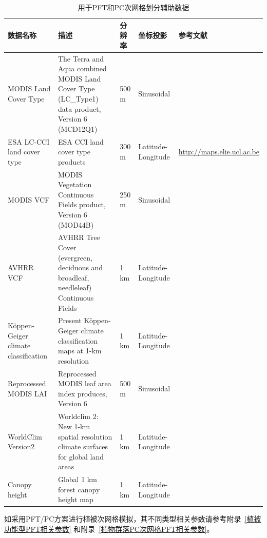 \begin{landscape}
\begin{table}[htbp]
\centering
\caption{用于PFT和PC次网格划分辅助数据}
\label{tab:网格划分辅助数据}

\begin{tabular}[h]{p{3cm}p{6cm}p{2cm}p{2cm}p{5cm}}
\toprule
数据名称      & 描述        & 分辨率   & 坐标投影     & 参考文献           \\ \midrule
MODIS Land Cover Type & The Terra and Aqua combined MODIS Land Cover Type (LC\_Type1) data product, Version 6 (MCD12Q1) & 500 m & Sinusoidal        & \citet{Friedl2019}                \\\midrule
ESA LC-CCI land cover type         & ESA CCI land cover type products                                                                & 300 m & Latitude-Longitude & \url{http://maps.elie.ucl.ac.be} \\\midrule
MODIS VCF      & MODIS Vegetation Continuous Fields product, Version 6 (MOD44B)                                           & 250 m    & Sinusoidal         & \citet{DiMiceli2015}                        \\\midrule
AVHRR VCF& AVHRR Tree Cover (evergreen, deciduous and broadleaf, needleleaf) Continuous Fields                      & 1 km  & Latitude-Longitude & \citet{defries2000new}                         \\\midrule
Köppen-Geiger climate classification        & Present Köppen-Geiger climate classification maps at 1-km resolution                            & 1 km  & Latitude-Longitude & \citet{beck2018}     \\\midrule
Reprocessed MODIS LAI                 & Reprocessed MODIS leaf area index produces, Version 6                                           & 500 m & Sinusoidal         & \citet{yuan2011reprocessing}     \\\midrule
WorldClim Version2                    & Worldclim 2: New 1-km spatial resolution climate surfaces for global land areas                          & 1 km  & Latitude-Longitude & \citet{fick2017worldclim}   \\\midrule
Canopy height                         & Global 1 km forest canopy height map                                                            & 1 km  & Latitude-Longitude & \citet{simard2011mapping}             \\ \bottomrule
\end{tabular}
\end{table}
\end{landscape}
如采用PFT/PC方案进行植被次网格模拟，其不同类型相关参数请参考附录~\ref{植被功能型PFT相关参数} 和附录~\ref{植物群落PC次网格PFT相关参数}。


